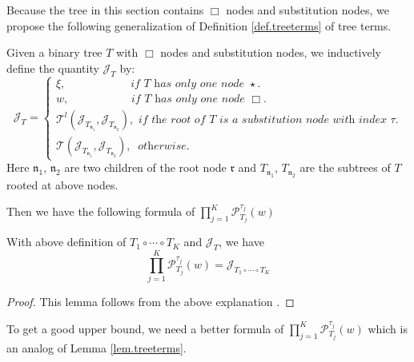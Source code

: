 Because the tree in this section contains $\Box$ nodes and substitution nodes, we propose the following generalization of Definition \ref{def.treeterms} of tree terms.

\begin{defn}\label{def.treetermsoperator} Given a binary tree $T$ with $\Box$ nodes and substitution nodes, we inductively define the quantity $\mathcal{J}_T$ by:
\begin{equation}\label{eq.treetermoperator.threewave}
    \mathcal{J}_T=
    \begin{cases}
    \xi, \qquad\qquad\quad\ \   \textit{ if $T$ has only one node $\star$.}
    \\
    w, \qquad\qquad\quad\ \textit{ if $T$ has only one node $\Box$.}
    \\
    \mathcal{T}^l(\mathcal{J}_{T_{\mathfrak{n}_1}}, \mathcal{J}_{T_{\mathfrak{n}_2}}), \textit{ if the root of $T$ is a substitution node with index $\tau$.}
    \\
    \mathcal{T}(\mathcal{J}_{T_{\mathfrak{n}_1}}, \mathcal{J}_{T_{\mathfrak{n}_2}}),\  \textit{ otherwise.}
    \end{cases}
\end{equation}
Here $\mathfrak{n}_1$, $\mathfrak{n}_2$ are two children of the root node $\mathfrak{r}$ and $T_{\mathfrak{n}_1}$, $T_{\mathfrak{n}_2}$ are the subtrees of $T$ rooted at above nodes.
\end{defn}

Then we have the following formula of $\prod_{j=1}^K\mathcal{P}^{\tau_j}_{T_j}(w)$

\begin{lem}
With above definition of $T_1\circ \cdots \circ T_{K}$ and $\mathcal{J}_T$, we have 
\begin{equation}\label{eq.operatoreqsimple.threewave}
    \prod_{j=1}^K\mathcal{P}^{\tau_j}_{T_j}(w)=\mathcal{J}_{T_1\circ \cdots \circ T_{K}}
\end{equation}
\end{lem}
\begin{proof}
This lemma follows from the above explanation .
\end{proof}

To get a good upper bound, we need a better formula of $\prod_{j=1}^K\mathcal{P}^{\tau_j}_{T_j}(w)$ which is an analog of Lemma \ref{lem.treeterms}. 

